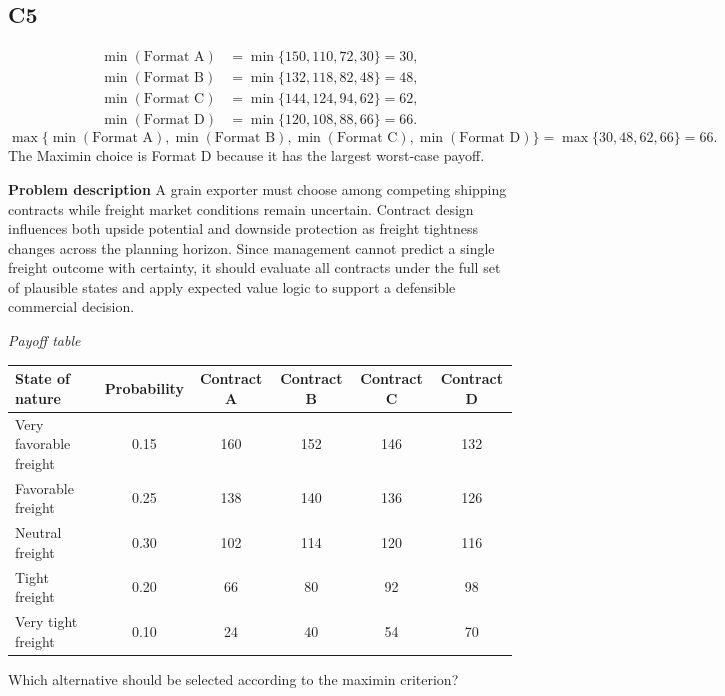 \begin{ExamProblems}
		\subsection*{C5}
			\[
			\begin{aligned}
			\min(\text{Format A}) &= \min\{150,110,72,30\} = 30,\\
			\min(\text{Format B}) &= \min\{132,118,82,48\} = 48,\\
			\min(\text{Format C}) &= \min\{144,124,94,62\} = 62,\\
			\min(\text{Format D}) &= \min\{120,108,88,66\} = 66.
			\end{aligned}
			\]
			\[
			\max\{\min(\text{Format A}), \min(\text{Format B}), \min(\text{Format C}), \min(\text{Format D})\}
			= \max\{30, 48, 62, 66\}
			= 66.
			\]
			The Maximin choice is Format D because it has the largest worst-case payoff.
		\item
		\textbf{Problem description}
		A grain exporter must choose among competing shipping contracts while freight market conditions remain uncertain. Contract design influences both upside potential and downside protection as freight tightness changes across the planning horizon. Since management cannot predict a single freight outcome with certainty, it should evaluate all contracts under the full set of plausible states and apply expected value logic to support a defensible commercial decision.

		\begin{center}
			\textit{Payoff table}
			\begin{tabular}{l c c c c c}
				\toprule
				State of nature & Probability & Contract A & Contract B & Contract C & Contract D \\
				\midrule
				Very favorable freight & 0.15 & 160 & 152 & 146 & 132 \\
				Favorable freight & 0.25 & 138 & 140 & 136 & 126 \\
				Neutral freight & 0.30 & 102 & 114 & 120 & 116 \\
				Tight freight & 0.20 & 66 & 80 & 92 & 98 \\
				Very tight freight & 0.10 & 24 & 40 & 54 & 70 \\
				\bottomrule
			\end{tabular}
		\end{center}

		Which alternative should be selected according to the maximin criterion?


\end{ExamProblems}
